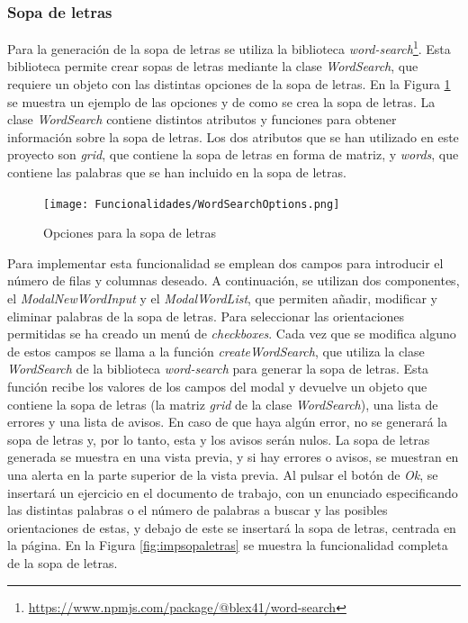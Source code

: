 \subsubsection{Sopa de letras}
\label{sec:impsopaletras}
Para la generación de la sopa de letras se utiliza la biblioteca \textit{word-search}\footnote{\url{https://www.npmjs.com/package/@blex41/word-search}}. Esta biblioteca permite crear sopas de letras mediante la clase \textit{WordSearch}, que requiere un objeto con las distintas opciones de la sopa de letras. En la Figura \ref{fig:impsopaletrasopciones} se muestra un ejemplo de las opciones y de como se crea la sopa de letras. La clase \textit{WordSearch} contiene distintos atributos y funciones para obtener información sobre la sopa de letras. Los dos atributos que se han utilizado en este proyecto son \textit{grid}, que contiene la sopa de letras en forma de matriz, y \textit{words}, que contiene las palabras que se han incluido en la sopa de letras.

\begin{figure}[ht!]
  \centering
  \texttt{[image: Funcionalidades/WordSearchOptions.png]}
  \caption{Opciones para la sopa de letras}
  \label{fig:impsopaletrasopciones}
\end{figure}

Para implementar esta funcionalidad se emplean dos campos para introducir el número de filas y columnas deseado. A continuación, se utilizan dos componentes, el \textit{ModalNewWordInput} y el \textit{ModalWordList}, que permiten añadir, modificar y eliminar palabras de la sopa de letras. Para seleccionar las orientaciones permitidas se ha creado un menú de \textit{checkboxes}. Cada vez que se modifica alguno de estos campos se llama a la función \textit{createWordSearch}, que utiliza la clase \textit{WordSearch} de la biblioteca \textit{word-search} para generar la sopa de letras. Esta función recibe los valores de los campos del modal y devuelve un objeto que contiene la sopa de letras (la matriz \textit{grid} de la clase \textit{WordSearch}), una lista de errores y una lista de avisos. En caso de que haya algún error, no se generará la sopa de letras y, por lo tanto, esta y los avisos serán nulos. La sopa de letras generada se muestra en una vista previa, y si hay errores o avisos, se muestran en una alerta en la parte superior de la vista previa. Al pulsar el botón de \textit{Ok}, se insertará un ejercicio en el documento de trabajo, con un enunciado especificando las distintas palabras o el número de palabras a buscar y las posibles orientaciones de estas, y debajo de este se insertará la sopa de letras, centrada en la página. En la Figura \ref{fig:impsopaletras} se muestra la funcionalidad completa de la sopa de letras.


